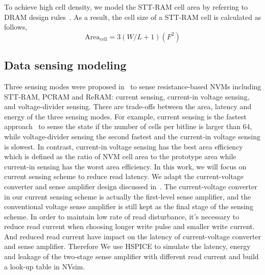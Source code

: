 To achieve high cell density, we model the STT-RAM cell area by referring to DRAM design rules~\cite{DRAM:6F2}.  As a result, the cell size of a STT-RAM cell is calculated as follows,
\begin{equation}
\mathrm{Area}_{\mathrm{cell}}={3\left(W/L+1\right)}(F^2)
\end{equation}

\subsection{Data sensing modeling}
Three sensing modes were proposed in~\cite{CACTI:DATE11:Xu} to sense resistance-based NVMs including STT-RAM, PCRAM and ReRAM: current sensing, current-in voltage sensing, and voltage-divider sensing. There are trade-offs between the area, latency and energy of the three sensing modes. For example, current sensing is the fastest approach~\cite{RRAM:ITRI11} to sense the state if the number of cells per bitline is larger than 64, while voltage-divider sensing the second fastest and the current-in voltage sensing is slowest. In contrast, current-in voltage sensing has the best area efficiency which is defined as the ratio of NVM cell area to the prototype area while current-in sensing has the worst area efficiency. In this work, we will focus on current sensing scheme to reduce read latency. We adapt the current-voltage converter and sense amplifier design discussed in~\cite{CACTI:DAC08:Dong}. The current-voltage converter in our current sensing scheme is actually the first-level sense amplifier, and the conventional voltage sense amplifier is still kept as the final stage of the sensing scheme. In order to maintain low rate of read disturbance, it's necessary to reduce read current when choosing longer write pulse and smaller write current. And reduced read current have impact on the latency of current-voltage converter and sense amplifier. Therefore We use HSPICE to simulate the latency, energy and leakage of the two-stage sense amplifier with different read current and build a look-up table in NVsim.

